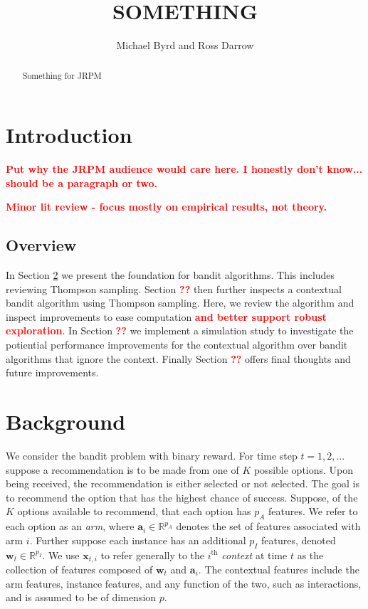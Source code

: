 \documentclass[12pt]{article}
\title{SOMETHING}
\author{Michael Byrd and Ross Darrow}
\newcommand{\bred}[1]{\textbf{\textcolor{red}{#1}}}
\begin{document}
\maketitle

\begin{abstract}
Something for JRPM
\end{abstract}

\section{Introduction}

\bred{Put why the JRPM audience would care here. I honestly don't know... should
be a paragraph or two.}

\bred{Minor lit review - focus mostly on empirical results, not theory.}

\subsection{Overview}

In Section \ref{sec:background} we present the foundation for bandit algorithms.
This includes reviewing Thompson sampling.  
Section \bred{??} then further inspects a contextual bandit algorithm using 
Thompson sampling. 
Here, we review the algorithm and inspect improvements to ease computation 
\bred{and better support robust exploration}.
In Section \bred{??} we implement a simulation study to investigate the potiential 
performance improvements for the contextual algorithm over bandit algorithms that
ignore the context.
Finally Section \bred{??} offers final thoughts and future improvements.


\section{Background} \label{sec:background}


We consider the bandit problem with binary reward.
For time step $t = 1, 2, \ldots$ suppose a recommendation is to be made from one 
of $K$ possible options.
Upon being received, the recommendation is either selected or not selected.
The goal is to recommend the option that has the highest chance of success.
Suppose, of the $K$ options available to recommend, that each option has $p_A$ 
features.
We refer to each option as an \textit{arm}, where 
$\bm{a}_i \in \mathbb{R}^{p_A}$
denotes the set of features associated with arm $i$. 
Further suppose each instance has an additional $p_I$ features, denoted 
$\bm{w}_t \in \mathbb{R}^{p_I}$.
We use $\bm{x}_{t,i}$ to refer generally to the $i^{\text{th}}$ \textit{context} 
at time $t$ as the collection of features composed of $\bm{w}_t$ and $\bm{a}_i$. 
The contextual features include the arm features, instance features, and any 
function of the two, such as interactions, and is assumed to be of dimension $p$.
\end{document}

